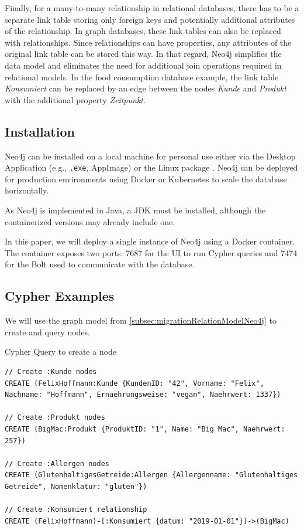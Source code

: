 Finally, for a many-to-many relationship in relational databases, there has to be a separate link table storing only foreign keys and potentially additional attributes of the relationship. In graph databases, these link tables can also be replaced with relationships. Since relationships can have properties, any attributes of the original link table can be stored this way. In that regard, Neo4j simplifies the data model and eliminates the need for additional join operations required in relational models. In the food consumption database example, the link table \textit{Konsumiert} can be replaced by an edge between the nodes \textit{Kunde} and \textit{Produkt} with the additional property \textit{Zeitpunkt}.

\subsection{Installation} \label{subsec:installationNeo4j}

Neo4j can be installed on a local machine for personal use either via the Desktop Application (e.g., \texttt{.exe}, AppImage) or the Linux package \parencite{neo4j_neo4j_nodate}. Neo4j can be deployed for production environments using Docker \parencite{neo4j_docs_introduction_nodate} or Kubernetes to scale the database horizontally.

As Neo4j is implemented in Java, a \ac{JDK} must be installed, although the containerized versions may already include one.

In this paper, we will deploy a single instance of Neo4j using a Docker container. The container exposes two ports: \num{7687} for the \ac{UI} to run Cypher queries and \num{7474} for the \ac{Bolt} used to communicate with the database.

\subsection{Cypher Examples} \label{subsec:queryingNeo4j}

We will use the graph model from \autoref{subsec:migrationRelationModelNeo4j} to create and query nodes.

\begin{code}[H]
    \caption{Cypher Query to create a node} \label{code:cypherCreateNode}
    \begin{verbatim}
// Create :Kunde nodes
CREATE (FelixHoffmann:Kunde {KundenID: "42", Vorname: "Felix", Nachname: "Hoffmann", Ernaehrungsweise: "vegan", Naehrwert: 1337})

// Create :Produkt nodes
CREATE (BigMac:Produkt {ProduktID: "1", Name: "Big Mac", Naehrwert: 257})

// Create :Allergen nodes
CREATE (GlutenhaltigesGetreide:Allergen {Allergenname: "Glutenhaltiges Getreide", Nomenklatur: "gluten"})

// Create :Konsumiert relationship
CREATE (FelixHoffmann)-[:Konsumiert {datum: "2019-01-01"}]->(BigMac)
    \end{verbatim}
\end{code}

